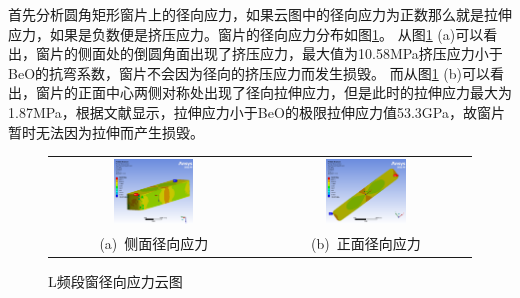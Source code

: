 \documentclass[master]{thesis-uestc}
\begin{document}
首先分析圆角矩形窗片上的径向应力，如果云图中的径向应力为正数那么就是拉伸应力，如果是负数便是挤压应力。窗片的径向应力分布如图\ref{fig:L频段窗径向应力}。
从图\ref{fig:L频段窗径向应力} (a)可以看出，窗片的侧面处的倒圆角面出现了挤压应力，最大值为10.58MPa挤压应力小于BeO的抗弯系数，窗片不会因为径向的挤压应力而发生损毁。
而从图\ref{fig:L频段窗径向应力} (b)可以看出，窗片的正面中心两侧对称处出现了径向拉伸应力，但是此时的拉伸应力最大为1.87MPa，根据文献\cite{mortazavi2021high}显示，拉伸应力小于BeO的极限拉伸应力值53.3GPa，故窗片暂时无法因为拉伸而产生损毁。
\begin{figure}[!htb]
    \small
    \centering
    \begin{tabular}{@{\ }c@{\ }c}
        \includegraphics[width=0.4\textwidth]{pic/chapter4/L径向应力侧面.png} & 
        \hspace{5pt}
        \includegraphics[width=0.4\textwidth]{pic/chapter4/L径向应力正面.png}     \\
        \mbox{\small (a) 侧面径向应力}                                                                               & 
        \mbox{\small (b) 正面径向应力}                                                                                  \\
    \end{tabular}
    \caption{L频段窗径向应力云图}
    \label{fig:L频段窗径向应力}
\end{figure}
\end{document}
